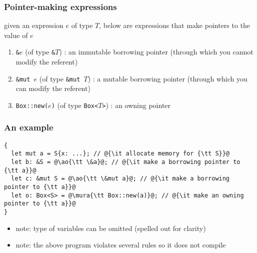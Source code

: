 \documentclass[12pt,dvipdfmx]{beamer}
\newcommand{\mura}[1]{{\color{purple}#1}}
\newcommand{\ao}[1]{{\color{blue}#1}}
\begin{document}
\begin{frame}
  \frametitle{Pointer-making expressions}
  given an expression $e$ of type $T$, below are expressions that
  make pointers to the value of $e$
  \begin{enumerate}
  \item \ao{\tt \&$e$} (of type \ao{\tt \&$T$})
    : an immutable borrowing pointer (through which you cannot modify the referent)
  \item \ao{\tt \&mut $e$} (of type \ao{\tt \&mut $T$})
    : a mutable borrowing pointer (through which you can modify the referent)
  \item \mura{\tt Box::new($e$)} (of type \mura{\tt Box<$T$>})
    : an owning pointer
  \end{enumerate}
\end{frame}

\begin{frame}[fragile]
  \frametitle{An example}
  \begin{lstlisting}
{
  let mut a = S{x: ...}; // @{\it allocate memory for {\tt S}}@
  let b: &S = @\ao{\tt \&a}@; // @{\it make a borrowing pointer to {\tt a}}@
  let c: &mut S = @\ao{\tt \&mut a}@; // @{\it make a borrowing pointer to {\tt a}}@
  let o: Box<S> = @\mura{\tt Box::new(a)}@; // @{\it make an owning pointer to {\tt a}}@
}
  \end{lstlisting}
  
  \begin{itemize}
  \item note: type of variables can be omitted (spelled out for clarity)
  \item note: the above program violates several rules so it does not compile
  \end{itemize}
\end{frame}

\end{document}
